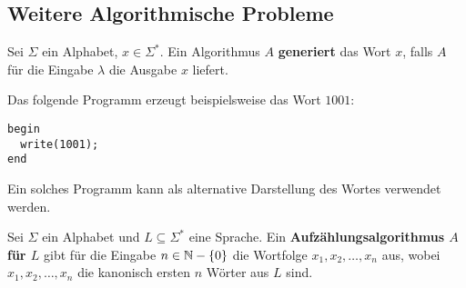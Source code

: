 \subsection{Weitere Algorithmische Probleme}
\begin{definition}
Sei $\Sigma$ ein Alphabet, $x \in \Sigma^*$. Ein Algorithmus $A$ \textbf{generiert} das Wort $x$, falls $A$ für die Eingabe $\lambda$ die Ausgabe $x$ liefert.\\
\end{definition}

Das folgende Programm erzeugt beispielsweise das Wort $1001$:
\begin{lstlisting}
begin
  write(1001);
end
\end{lstlisting}

Ein solches Programm kann als alternative Darstellung des Wortes verwendet werden.\\

\begin{definition}
Sei $\Sigma$ ein Alphabet und $L \subseteq \Sigma^*$ eine Sprache. Ein \textbf{Aufzählungsalgorithmus $A$ für $L$} gibt für die Eingabe $n \in \mathbb{N} - \{0\}$ die Wortfolge $x_1, x_2, \ldots, x_n$ aus, wobei $x_1, x_2, \ldots, x_n$ die kanonisch ersten $n$ Wörter aus $L$ sind.
\end{definition}